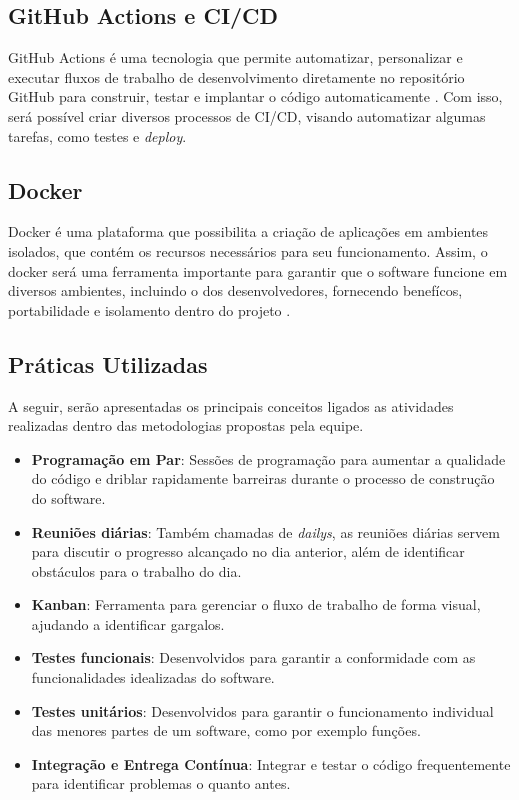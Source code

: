 \subsection{GitHub Actions e CI/CD}
GitHub Actions é uma tecnologia que permite automatizar, personalizar e executar fluxos de trabalho de desenvolvimento diretamente no repositório GitHub para construir, testar e implantar o código automaticamente \cite{githubactions}. Com isso, será possível criar diversos processos de CI/CD, visando automatizar algumas tarefas, como testes e \textit{deploy}.

\subsection{Docker}
Docker é uma plataforma que possibilita a criação de aplicações em ambientes isolados, que contém os recursos necessários para seu funcionamento. Assim, o docker será uma ferramenta importante para garantir que o software funcione em diversos ambientes, incluindo o dos desenvolvedores, fornecendo benefícos, portabilidade e isolamento dentro do projeto \cite{dockerdocs}.

\subsection{Práticas Utilizadas}
A seguir, serão apresentadas os principais conceitos ligados as atividades realizadas dentro das metodologias propostas pela equipe.

\begin{itemize}
    \item \textbf{Programação em Par}: Sessões de programação para aumentar a qualidade do código e driblar rapidamente barreiras durante o processo de construção do software.
    \item \textbf{Reuniões diárias}: Também chamadas de \textit{dailys}, as reuniões diárias servem para discutir o progresso alcançado no dia anterior, além de identificar obstáculos para o trabalho do dia.
    \item \textbf{Kanban}: Ferramenta para gerenciar o fluxo de trabalho de forma visual, ajudando a identificar gargalos.
    \item \textbf{Testes funcionais}: Desenvolvidos para garantir a conformidade com as funcionalidades idealizadas do software.
    \item \textbf{Testes unitários}: Desenvolvidos para garantir o funcionamento individual das menores partes de um software, como por exemplo funções.
    \item \textbf{Integração e Entrega Contínua}: Integrar e testar o código frequentemente para identificar problemas o quanto antes.
\end{itemize}

